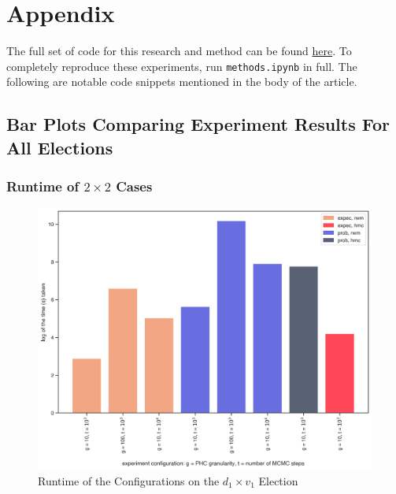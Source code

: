 \chapter{Appendix}
\label{chap:appendix}

The full set of code for this research and method can be found \href{https://github.com/hangulu/thesis}{here}. To completely reproduce these experiments, run \texttt{methods.ipynb} in full. The following are notable code snippets mentioned in the body of the article.





\section{Bar Plots Comparing Experiment Results For All Elections}
\label{sec:appendix_bars}

\FloatBarrier
\subsection{Runtime of $2 \times 2$ Cases}

\begin{figure}[ht]\centering
 \includegraphics[width=0.75\linewidth]{figures/1_1_time.png}
 \caption{Runtime of the Configurations on the $d_1 \times v_1$ Election}
 \label{fig:1_1_time_append}
\end{figure}

